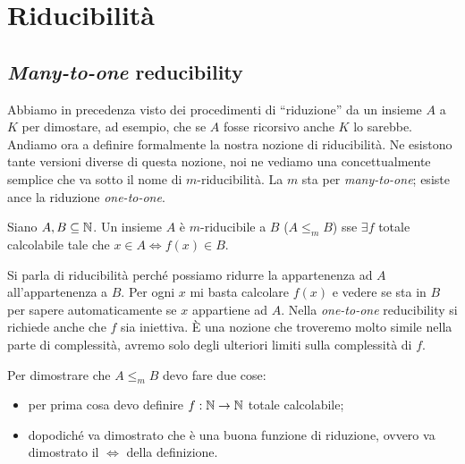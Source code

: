 %
%
%
%
\chapter{Riducibilità}

\section{\emph{Many-to-one} reducibility}

Abbiamo in precedenza visto dei procedimenti di ``riduzione'' da un insieme $A$ a $K$ per dimostare,
ad esempio, che se $A$ fosse ricorsivo anche $K$ lo sarebbe. Andiamo ora a definire formalmente la
nostra nozione di riducibilità. Ne esistono tante versioni diverse di questa nozione, noi ne
vediamo una concettualmente semplice che va sotto il nome di $m$-riducibilità. La $m$ sta per
\emph{many-to-one}; esiste ance la riduzione \emph{one-to-one}.

\begin{defn}
    Siano $A,B \subseteq \mathbb{N}$. Un insieme $A$ è $m$-riducibile a $B$ ($A \leq_{m} B$) sse
    $\exists f$ totale calcolabile tale che $x \in A \iff f(x) \in B$.
\end{defn}

Si parla di riducibilità perché possiamo ridurre la appartenenza ad $A$ all'appartenenza a $B$.
Per ogni $x$ mi basta calcolare $f(x)$ e vedere se sta in $B$ per sapere automaticamente se $x$
appartiene ad $A$. Nella \emph{one-to-one} reducibility si richiede anche che $f$ sia iniettiva. È una
nozione che troveremo molto simile nella parte di complessità, avremo solo degli ulteriori limiti
sulla complessità di $f$. 

Per dimostrare che $A \leq_{m} B$ devo fare due cose:
\begin{itemize}
    \item per prima cosa devo definire $f: \mathbb{N} \to \mathbb{N}$ totale calcolabile;
    \item dopodiché va dimostrato che è una buona funzione di riduzione, ovvero va dimostrato il
    $\iff$ della definizione.
\end{itemize}

